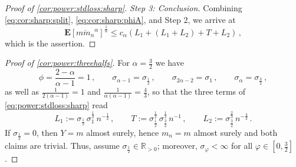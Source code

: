 \documentclass{article}
\newcommand{\R}{\mathbb{R}}
\newcommand{\Rpp}{\R_{>0}}
\newcommand{\lab}{\left[} %
\newcommand{\rab}{\right]} %
\newcommand{\ab}[1]{\lab #1 \rab} %
\newcommand{\abOf}[1]{\!\ab{#1}} %
\newcommand{\lb}{\left(} %
\newcommand{\rb}{\right)} %
\newcommand{\br}[1]{\lb #1 \rb} %
\newcommand{\E}{\mathbf{E}} %
\newcommand{\EOf}[1]{\E\abOf{#1}}
\newcommand{\eqcm}{\,,} %
\newcommand{\eqfs}{\,.}
\newcommand{\ol}[2]{\overline{#1#2}}
\begin{document}
\begin{proof}[Proof of \cref{cor:power:stdloss:sharp}]
     \emph{Step 3: Conclusion.}
     Combining \eqref{eq:cor:sharp:split}, \eqref{eq:cor:sharp:phiA}, and Step 2, we arrive at
     \begin{equation}
         \EOf{\ol{m}{m_n}^\alpha}^{\frac1\alpha}
         \leq
         c_\alpha \br{L_1 + \br{L_1 + L_2} + T + L_2}
         \eqcm
     \end{equation}
     which is the assertion.
 \end{proof}

\begin{proof}[Proof of \cref{cor:power:threehalfs}]
    For $\alpha=\frac32$ we have
    \begin{equation}
        \phi = \frac{2-\alpha}{\alpha-1} = 1
        \eqcm\qquad
        \sigma_{\alpha-1} = \sigma_{\frac12}
        \eqcm\qquad
        \sigma_{2\alpha-2} = \sigma_{1}
        \eqcm\qquad
        \sigma_{\alpha} = \sigma_{\frac32}
        \eqcm
    \end{equation}
    as well as $\frac1{2(\alpha-1)} = 1$ and $\frac1{\alpha(\alpha-1)} = \frac43$, so that the three terms of \eqref{eq:power:stdloss:sharp} read
    \begin{equation}
        L_1 := \sigma_{\frac12}\, \sigma_1^{\frac12}\, n^{-\frac12}
        \eqcm\qquad
        T := \sigma_{\frac12}^{\frac12}\, \sigma_{\frac32}^{\frac12}\, n^{-1}
        \eqcm\qquad
        L_2 := \sigma_{\frac32}^{\frac23}\, n^{-\frac43}
        \eqfs
    \end{equation}
    If $\sigma_{\frac12} = 0$, then $Y = m$ almost surely, hence $m_n = m$ almost surely
    and both claims are trivial. Thus, assume $\sigma_{\frac12}\in\Rpp$; moreover, $\sigma_\varphi<\infty$ for all $\varphi\in[0,\frac32]$.
    

\end{proof}
\end{document}
